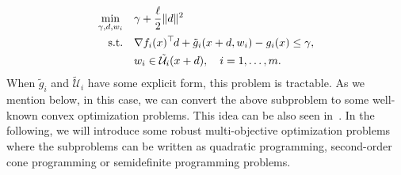 \documentclass[../../main]{subfiles}
\begin{document}
\begin{align} \label{eq:subproblem}
\begin{aligned}
\min_{\gamma, d, w_i} \quad   &\gamma + \frac{\ell}{2} \|d\|^2   \\ 
\mathrm{s.t.}    \quad   &\nabla f_i(x)^\top\hspace{-1pt} d + \tilde{g}_i (x + d, w_i) - g_i(x) \leq \gamma,\\
&w_i \in \tilde{\mathcal{U}}_i (x + d), \quad i = 1,\ldots,m .
\end{aligned}
\end{align}
When $\tilde{g}_i$ and $\tilde{\mathcal{U}}_i$ have some explicit form, this problem is tractable. As we mention below, in this case, we can convert the above subproblem to some well-known convex optimization problems. This idea can be also seen in~\cite{Ben-tal1998}. In the following, we will introduce some robust multi-objective optimization problems where the subproblems can be written as quadratic programming, second-order cone programming or semidefinite programming problems.






\end{document}
